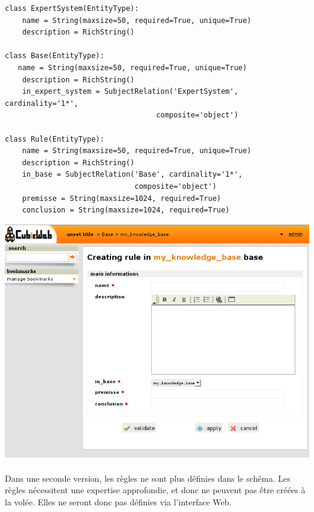 \documentclass {report}
\begin{document}
\begin{lstlisting}[caption= Schéma d'un système expert]
class ExpertSystem(EntityType):
    name = String(maxsize=50, required=True, unique=True)
    description = RichString()

class Base(EntityType):
   name = String(maxsize=50, required=True, unique=True)
    description = RichString()
    in_expert_system = SubjectRelation('ExpertSystem', cardinality='1*',
                      		       composite='object')

class Rule(EntityType):
    name = String(maxsize=50, required=True, unique=True)
    description = RichString()
    in_base = SubjectRelation('Base', cardinality='1*',
                              composite='object')
    premisse = String(maxsize=1024, required=True)
    conclusion = String(maxsize=1024, required=True)
\end{lstlisting}

\begin{center}
\includegraphics[scale=0.4]{se_rule_api.png}
\end{center}

\paragraph{}
Dans une seconde version, les règles ne sont plus définies dans le schéma. Les règles nécessitent une expertise approfondie, et donc ne peuvent pas être créées à la volée. Elles ne seront donc pas définies via l'interface Web.
\end{document}
